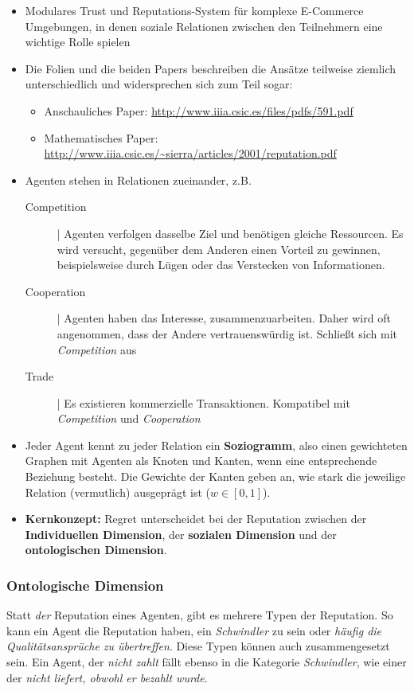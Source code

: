 \documentclass{article} %
\begin{document}
	\begin{itemize}
		\item Modulares Trust und Reputations-System für komplexe E-Commerce Umgebungen, in denen soziale Relationen zwischen den Teilnehmern eine wichtige Rolle spielen
		\item Die Folien und die beiden Papers beschreiben die Ansätze teilweise ziemlich unterschiedlich und widersprechen sich zum Teil sogar:
		\begin{itemize}
				\item Anschauliches Paper: \url{http://www.iiia.csic.es/files/pdfs/591.pdf}
				\item Mathematisches Paper:  \url{http://www.iiia.csic.es/~sierra/articles/2001/reputation.pdf}
		\end{itemize}
	
		\item Agenten stehen in Relationen zueinander, z.B.
		\begin{description}
			\item[Competition]| Agenten verfolgen dasselbe Ziel und benötigen gleiche Ressourcen.
			Es wird versucht, gegenüber dem Anderen einen Vorteil zu gewinnen, beispielsweise durch Lügen oder das Verstecken von Informationen.
			\item[Cooperation]| Agenten haben das Interesse, zusammenzuarbeiten.
			Daher wird oft angenommen, dass der Andere vertrauenswürdig ist.
			Schließt sich mit \emph{Competition} aus
			\item[Trade]| Es existieren kommerzielle Transaktionen.
			Kompatibel mit \emph{Competition} und \emph{Cooperation}
		\end{description}
		\item Jeder Agent kennt zu jeder Relation ein \textbf{Soziogramm}, also einen gewichteten Graphen mit Agenten als Knoten und Kanten, wenn eine entsprechende Beziehung besteht.
		Die Gewichte der Kanten geben an, wie stark die jeweilige Relation (vermutlich) ausgeprägt ist ($w\in [0,1]$).
		\item \textbf{Kernkonzept:} Regret unterscheidet bei der Reputation zwischen der \textbf{Individuellen Dimension}, der \textbf{sozialen Dimension} und der \textbf{ontologischen Dimension}.
	\end{itemize}
	\subsubsection{Ontologische Dimension}
	Statt \emph{der} Reputation eines Agenten, gibt es mehrere Typen der Reputation.
	So kann ein Agent die Reputation haben, ein \emph{Schwindler} zu sein oder \emph{häufig die Qualitätsansprüche zu übertreffen}. 
	Diese Typen können auch zusammengesetzt sein.
	Ein Agent, der \emph{nicht zahlt} fällt ebenso in die Kategorie \emph{Schwindler}, wie einer der \emph{nicht liefert, obwohl er bezahlt wurde}.
\end{document}
